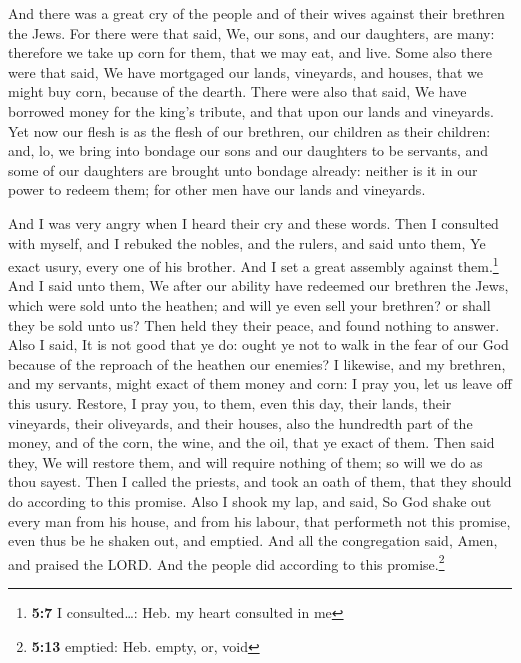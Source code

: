  And there was a great cry of the people and of their
wives against their brethren the Jews.  For there were
that said, We, our sons, and our daughters, are many: therefore we take
up corn for them, that we may eat, and live.  Some also
there were that said, We have mortgaged our lands, vineyards, and
houses, that we might buy corn, because of the dearth. 
There were also that said, We have borrowed money for the king's
tribute, and that upon our lands and vineyards.  Yet now
our flesh is as the flesh of our brethren, our children as their
children: and, lo, we bring into bondage our sons and our daughters to
be servants, and some of our daughters are brought unto bondage already:
neither is it in our power to redeem them; for other men have our lands
and vineyards.

 And I was very angry when I heard their cry and these
words.  Then I consulted with myself, and I rebuked the
nobles, and the rulers, and said unto them, Ye exact usury, every one of
his brother. And I set a great assembly against them.\footnote{\textbf{5:7}
  I consulted\ldots: Heb. my heart consulted in me}  And I
said unto them, We after our ability have redeemed our brethren the
Jews, which were sold unto the heathen; and will ye even sell your
brethren? or shall they be sold unto us? Then held they their peace, and
found nothing to answer.  Also I said, It is not good that
ye do: ought ye not to walk in the fear of our God because of the
reproach of the heathen our enemies?  I likewise, and my
brethren, and my servants, might exact of them money and corn: I pray
you, let us leave off this usury.  Restore, I pray you,
to them, even this day, their lands, their vineyards, their oliveyards,
and their houses, also the hundredth part of the money, and of the corn,
the wine, and the oil, that ye exact of them.  Then said
they, We will restore them, and will require nothing of them; so will we
do as thou sayest. Then I called the priests, and took an oath of them,
that they should do according to this promise.  Also I
shook my lap, and said, So God shake out every man from his house, and
from his labour, that performeth not this promise, even thus be he
shaken out, and emptied. And all the congregation said, Amen, and
praised the LORD. And the people did according to this
promise.\footnote{\textbf{5:13} emptied: Heb. empty, or, void}

